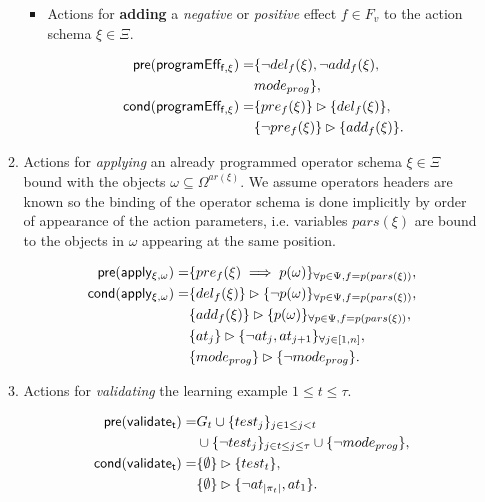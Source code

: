 \documentclass{article}
\newcommand{\pre}{\mathsf{pre}}     %
\newcommand{\cond}{\mathsf{cond}}   %
\begin{document}
\begin{itemize}
\begin{enumerate}
\begin{itemize}
\item Actions for {\bf adding} a {\em negative} or {\em positive} effect $f\in F_v$ to the action schema $\xi\in\Xi$.

\begin{small}
\begin{align*}
\hspace*{7pt}\pre(\mathsf{programEff_{f,\xi}})=&\{\neg del_{f}(\xi),\neg add_{f}(\xi),\\
& mode_{prog}\},\\
\cond(\mathsf{programEff_{f,\xi}})=&\{pre_{f}(\xi)\}\rhd\{del_{f}(\xi)\},\\
&\{\neg pre_{f}(\xi)\}\rhd\{add_{f}(\xi)\}.
\end{align*}
\end{small}
\end{itemize}

\item Actions for {\em applying} an already programmed operator schema $\xi\in\Xi$ bound with the objects $\omega\subseteq\Omega^{ar(\xi)}$. We assume operators headers are known so the binding of the operator schema is done implicitly by order of appearance of the action parameters, i.e. variables $pars(\xi)$ are bound to the objects in $\omega$ appearing at the same position. 
\begin{small}
\begin{align*}
\hspace*{7pt}\pre(\mathsf{apply_{\xi,\omega}})=&\{pre_{f}(\xi)\implies p(\omega)\}_{\forall p\in\Psi,f=p(pars(\xi))},\\
\cond(\mathsf{apply_{\xi,\omega}})=&\{del_{f}(\xi)\}\rhd\{\neg p(\omega)\}_{\forall p\in\Psi,f=p(pars(\xi))},\\
&\{add_{f}(\xi)\}\rhd\{p(\omega)\}_{\forall p\in\Psi,f=p(pars(\xi))},\\
&\{at_{j}\}\rhd\{\neg at_{j},at_{j+1}\}_{\forall j\in [1,n]},\\
&\{mode_{prog}\}\rhd\{\neg mode_{prog}\}.
\end{align*}
\end{small}

\item Actions for {\em validating} the learning example {\tt\small $1\leq t\leq \tau$}. 
\begin{small}
\begin{align*}
\hspace*{7pt}\pre(\mathsf{validate_{t}})=&G_t\cup\{test_j\}_{j\in 1\leq j<t}\\
&\cup\{\neg test_j\}_{j\in t\leq j\leq \tau}\cup \{\neg mode_{prog}\},\\
\cond(\mathsf{validate_{t}})=&\{\emptyset\}\rhd\{test_t\},\\
&\{\emptyset\}\rhd\{\neg at_{|\pi_t|},at_1\}.
\end{align*}
\end{small}
\end{enumerate}
\end{itemize}
\end{document}

